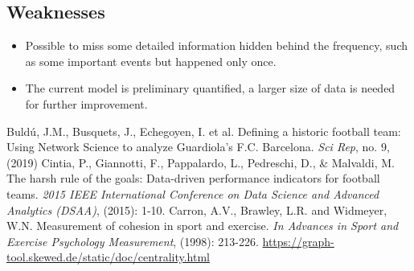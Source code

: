 \documentclass{mcmthesis}
\begin{document}
    \subsection{Weaknesses}
        \begin{itemize}
            \item Possible to miss some detailed information hidden behind the frequency, such as some important events but happened only once.
            \item The current model is preliminary quantified, a larger size of data is needed for further improvement.
        \end{itemize}

\newpage
\begin{thebibliography}{99}
 Buld\'{u}, J.M., Busquets, J., Echegoyen, I. et al. Defining a historic football team: Using Network Science to analyze Guardiola’s F.C. Barcelona. \textit{Sci Rep}, no. 9, (2019)
Cintia, P., Giannotti, F., Pappalardo, L., Pedreschi, D., \& Malvaldi, M. The harsh rule of the goals: Data-driven performance indicators for football teams.\textit{ 2015 IEEE International Conference on Data Science and Advanced Analytics (DSAA)}, (2015): 1-10.
Carron, A.V., Brawley, L.R. and Widmeyer, W.N. Measurement of cohesion in sport and exercise. \textit{In Advances in Sport and Exercise Psychology Measurement}, (1998): 213-226.
\url{https://graph-tool.skewed.de/static/doc/centrality.html}
\end{thebibliography}
\end{document}
